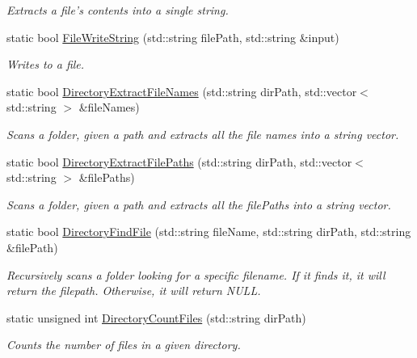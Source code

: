 \begin{DoxyCompactItemize}
\begin{DoxyCompactList}\small\item\em Extracts a file's contents into a single string. \end{DoxyCompactList}\item 
static bool \hyperlink{classDCEngine_1_1FileSystem_a97035c3f02255c77cabf854e64eac0ec}{File\-Write\-String} (std\-::string file\-Path, std\-::string \&input)
\begin{DoxyCompactList}\small\item\em Writes to a file. \end{DoxyCompactList}\item 
static bool \hyperlink{classDCEngine_1_1FileSystem_a1203cfae04c881fb21339876ea08284b}{Directory\-Extract\-File\-Names} (std\-::string dir\-Path, std\-::vector$<$ std\-::string $>$ \&file\-Names)
\begin{DoxyCompactList}\small\item\em Scans a folder, given a path and extracts all the file names into a string vector. \end{DoxyCompactList}\item 
static bool \hyperlink{classDCEngine_1_1FileSystem_a7e04160eae671d108508d76493da583e}{Directory\-Extract\-File\-Paths} (std\-::string dir\-Path, std\-::vector$<$ std\-::string $>$ \&file\-Paths)
\begin{DoxyCompactList}\small\item\em Scans a folder, given a path and extracts all the file\-Paths into a string vector. \end{DoxyCompactList}\item 
static bool \hyperlink{classDCEngine_1_1FileSystem_af34d54d8515dbda3f87bf14b12f2a7c8}{Directory\-Find\-File} (std\-::string file\-Name, std\-::string dir\-Path, std\-::string \&file\-Path)
\begin{DoxyCompactList}\small\item\em Recursively scans a folder looking for a specific filename. If it finds it, it will return the filepath. Otherwise, it will return N\-U\-L\-L. \end{DoxyCompactList}\item 
static unsigned int \hyperlink{classDCEngine_1_1FileSystem_a4992c4473108c21c9479f582a45ebe7a}{Directory\-Count\-Files} (std\-::string dir\-Path)
\begin{DoxyCompactList}\small\item\em Counts the number of files in a given directory. \end{DoxyCompactList}\item 

\end{DoxyCompactItemize}
